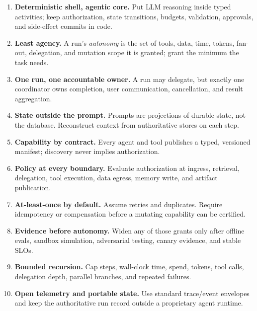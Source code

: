 \begin{enumerate}

\item \textbf{Deterministic shell, agentic core.} Put LLM reasoning inside typed activities; keep authorization, state transitions, budgets, validation, approvals, and side-effect commits in code.

\item \textbf{Least agency.} A run's \emph{autonomy} is the set of tools, data, time, tokens, fan-out, delegation, and mutation scope it is granted; grant the minimum the task needs.

\item \textbf{One run, one accountable owner.} A run may delegate, but exactly one coordinator owns completion, user communication, cancellation, and result aggregation.

\item \textbf{State outside the prompt.} Prompts are projections of durable state, not the database. Reconstruct context from authoritative stores on each step.

\item \textbf{Capability by contract.} Every agent and tool publishes a typed, versioned manifest; discovery never implies authorization.

\item \textbf{Policy at every boundary.} Evaluate authorization at ingress, retrieval, delegation, tool execution, data egress, memory write, and artifact publication.

\item \textbf{At-least-once by default.} Assume retries and duplicates. Require idempotency or compensation before a mutating capability can be certified.

\item \textbf{Evidence before autonomy.} Widen any of those grants only after offline evals, sandbox simulation, adversarial testing, canary evidence, and stable SLOs.

\item \textbf{Bounded recursion.} Cap steps, wall-clock time, spend, tokens, tool calls, delegation depth, parallel branches, and repeated failures.

\item \textbf{Open telemetry and portable state.} Use standard trace/event envelopes and keep the authoritative run record outside a proprietary agent runtime.

\end{enumerate}

